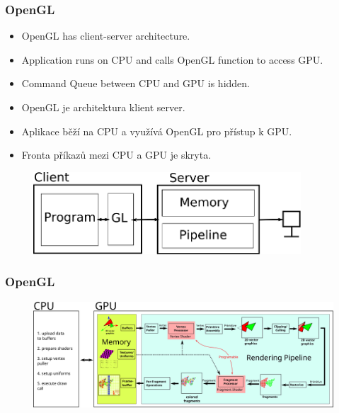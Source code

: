 \begin{frame}\frametitle{OpenGL}\scriptsize
\begin{itemize}
  \item OpenGL has client-server architecture.
  \item Application runs on CPU and calls OpenGL function to access GPU.
  \item Command Queue between CPU and GPU is hidden.
\end{itemize}

\begin{itemize}
  \item OpenGL je architektura klient server.
  \item Aplikace běží na CPU a využívá OpenGL pro přístup k GPU.
  \item Fronta příkazů mezi CPU a GPU je skryta.
\end{itemize}
\begin{figure}[h]
  \includegraphics[width=10cm,keepaspectratio]{pics/opengl/clientserver}
\end{figure}
\end{frame}

\begin{frame}
\frametitle{OpenGL}
\begin{figure}[h]
	\includegraphics[width=14cm,keepaspectratio]{pics/opengl/RenderingPipeline}
\end{figure}
\end{frame}

